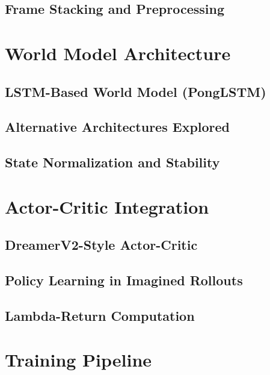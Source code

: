 \documentclass[
	english,
	ruledheaders=section,
	class=report,
	thesis={type=master},
	accentcolor=9c,
	custommargins=true,
	marginpar=false,
	parskip=half-,
	fontsize=11pt,
]{tudapub}
\begin{document}
\subsection{Frame Stacking and Preprocessing}
\label{subsec:preprocessing}

\section{World Model Architecture}
\label{sec:world_model_arch}

\subsection{LSTM-Based World Model (PongLSTM)}
\label{subsec:ponglstm}

\subsection{Alternative Architectures Explored}
\label{subsec:alternative_architectures}

\subsection{State Normalization and Stability}
\label{subsec:normalization}

\section{Actor-Critic Integration}
\label{sec:actor_critic}

\subsection{DreamerV2-Style Actor-Critic}
\label{subsec:dreamer_ac}

\subsection{Policy Learning in Imagined Rollouts}
\label{subsec:imagined_rollouts}

\subsection{Lambda-Return Computation}
\label{subsec:lambda_returns}

\section{Training Pipeline}
\label{sec:training_pipeline}
\end{document}
